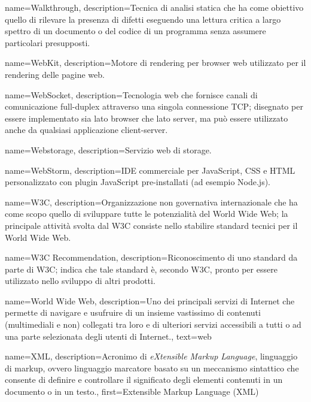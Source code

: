 {
name={Walkthrough},
description={Tecnica di analisi statica che ha come obiettivo quello di rilevare la presenza di difetti eseguendo una lettura critica a largo spettro di un documento o del codice di un programma senza assumere particolari presupposti.}
}

{
name={WebKit},
description={Motore di rendering per browser web utilizzato per il rendering delle pagine web.}
}

{
name={WebSocket},
description={Tecnologia web che fornisce canali di comunicazione full-duplex attraverso una singola connessione TCP; disegnato per essere implementato sia lato browser che lato server, ma può essere utilizzato anche da qualsiasi applicazione client-server.}
}

{
name={Webstorage},
description={Servizio web di storage.}
}

{
name={WebStorm},
description={IDE commerciale per JavaScript, CSS e HTML personalizzato con plugin JavaScript pre-installati (ad esempio Node.js).}
}

{
name={W3C},
description={Organizzazione non governativa internazionale che ha come scopo quello di sviluppare tutte le potenzialità del World Wide Web; la principale attività svolta dal W3C consiste nello stabilire standard tecnici per il World Wide Web.}
}

{
name={W3C Recommendation},
description={Riconoscimento di uno standard da parte di W3C; indica che tale standard è, secondo W3C, pronto per essere utilizzato nello sviluppo di altri prodotti.}
}

{
name={World Wide Web},
description={Uno dei principali servizi di Internet che permette di navigare e usufruire di un insieme vastissimo di contenuti (multimediali e non) collegati tra loro e di ulteriori servizi accessibili a tutti o ad una parte selezionata degli utenti di Internet.},
text={web}
}

{
name={XML},
description={Acronimo di \textit{eXtensible Markup Language}, linguaggio di markup, ovvero linguaggio marcatore basato su un meccanismo sintattico che consente di definire e controllare il significato degli elementi contenuti in un documento o in un testo.},
first={Extensible Markup Language (XML)}
}
